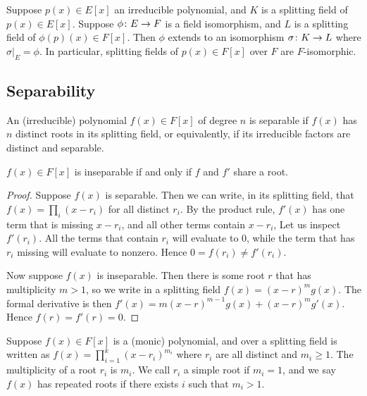 \begin{theorem}\label{thm:uniqueness-splitting-field}
    Suppose \(p(x) \in E[x]\) an irreducible polynomial,
    and \(K\) is a splitting field of \(p(x) \in E[x]\).
    Suppose \(\phi\colon E\to F\) is a field isomorphism,
    and \(L\) is a splitting field of \(\phi(p)(x) \in F[x]\).
    Then \(\phi\) extends to an isomorphism \(\sigma\colon K\to L\)
    where \(\sigma\vert_E = \phi\).
    In particular, splitting fields of \(p(x) \in F[x]\) over \(F\)
    are \(F\)-isomorphic.
\end{theorem}


\subsection{Separability}

\begin{definition}
    An (irreducible) polynomial \(f(x) \in F[x]\) of degree \(n\)
    is separable if \(f(x)\) has \(n\) distinct roots in its splitting field,
    or equivalently, if its irreducible factors are distinct and separable.
\end{definition}
\begin{proposition}\label{prop:derivative-inseparability}
    \(f(x) \in F[x]\) is inseparable
    if and only if \(f\) and \(f'\) share a root.
\end{proposition}
\begin{proof}
    Suppose \(f(x)\) is separable.
    Then we can write, in its splitting field,
    that \(f(x) = \prod_i (x-r_i)\) for all distinct \(r_i\).
    By the product rule,
    \(f'(x)\) has one term that is missing \(x-r_i\),
    and all other terms contain \(x-r_i\),
    Let us inspect \(f'(r_i)\).
    All the terms that contain \(r_i\) will evaluate to 0,
    while the term that has \(r_i\) missing will evaluate to nonzero.
    Hence \(0 = f(r_i) \neq f'(r_i)\).

    Now suppose \(f(x)\) is inseparable.
    Then there is some root \(r\) that has multiplicity \(m > 1\),
    so we write in a splitting field \(f(x) = {(x-r)}^m g(x)\).
    The formal derivative is then \(f'(x) = m{(x-r)}^{m-1} g(x) + {(x-r)}^m g'(x)\).
    Hence \(f(r) = f'(r) = 0\).
\end{proof}

\begin{definition}
    Suppose \(f(x) \in F[x]\) is a (monic) polynomial,
    and over a splitting field is written as
    \(f(x) = \prod_{i=1}^k {(x-r_i)}^{m_i}\)
    where \(r_i\) are all distinct and \(m_i \geq 1\).
    The multiplicity of a root \(r_i\) is \(m_i\).
    We call \(r_i\) a simple root if \(m_i = 1\),
    and we say \(f(x)\) has repeated roots if there exists \(i\)
    such that \(m_i > 1\).
\end{definition}

